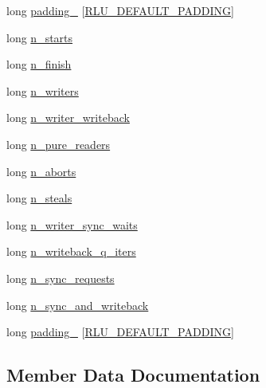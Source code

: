 \begin{DoxyCompactItemize}
long \hyperlink{structrlu__thread__data_afc656237075c8764b71cae61b2648427}{padding\+\_} \mbox{[}\hyperlink{rlu_8h_a52e9bd0565eaf64830bc7e85dde5f5cb}{R\+L\+U\+\_\+\+D\+E\+F\+A\+U\+L\+T\+\_\+\+P\+A\+D\+D\+I\+NG}\mbox{]}
\item 
long \hyperlink{structrlu__thread__data_af364d4681a22508dd2d44a60e4c5cd20}{n\+\_\+starts}
\item 
long \hyperlink{structrlu__thread__data_a3275393f5044fd11f6d2beb852573e79}{n\+\_\+finish}
\item 
long \hyperlink{structrlu__thread__data_a2c973d93f6b6a5422ef4f48461d196c3}{n\+\_\+writers}
\item 
long \hyperlink{structrlu__thread__data_a913d842253b153fd49f8390cd56988a9}{n\+\_\+writer\+\_\+writeback}
\item 
long \hyperlink{structrlu__thread__data_a13f452b4e62710231db05b8e8aca7f7a}{n\+\_\+pure\+\_\+readers}
\item 
long \hyperlink{structrlu__thread__data_a56e86f4e465d90e6c525c564b02b184e}{n\+\_\+aborts}
\item 
long \hyperlink{structrlu__thread__data_abf11e9e4e07b70096e7aa80c15a93b1b}{n\+\_\+steals}
\item 
long \hyperlink{structrlu__thread__data_a04ced688615775605d5a6047148b87df}{n\+\_\+writer\+\_\+sync\+\_\+waits}
\item 
long \hyperlink{structrlu__thread__data_aec97063115cd2844a36516b366471444}{n\+\_\+writeback\+\_\+q\+\_\+iters}
\item 
long \hyperlink{structrlu__thread__data_a58b83dc3c85c90b929b71c451378bc57}{n\+\_\+sync\+\_\+requests}
\item 
long \hyperlink{structrlu__thread__data_a7fed5939d4fb4d5b554c25f378b7838d}{n\+\_\+sync\+\_\+and\+\_\+writeback}
\item 
long \hyperlink{structrlu__thread__data_af2b921e98760e866cee69add1d02ca73}{padding\+\_} \mbox{[}\hyperlink{rlu_8h_a52e9bd0565eaf64830bc7e85dde5f5cb}{R\+L\+U\+\_\+\+D\+E\+F\+A\+U\+L\+T\+\_\+\+P\+A\+D\+D\+I\+NG}\mbox{]}
\end{DoxyCompactItemize}


\subsection{Member Data Documentation}
\mbox{\label{structrlu__thread__data_a44b3c5b3c0b42a7cd0bc0db1f0f2b2d9}} 
